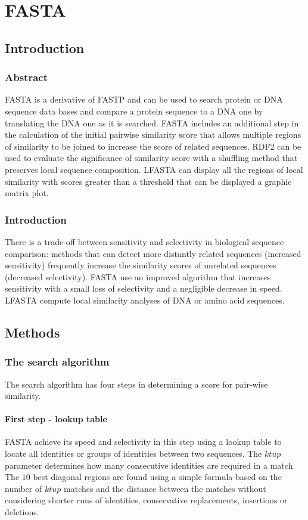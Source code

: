 \chapter{FASTA}

\section{Introduction}

	\subsection{Abstract}
	FASTA is a derivative of FASTP and can be used to search protein or DNA sequence data bases and compare a protein sequence to a DNA one by translating the DNA one as it is searched.
	FASTA includes an additional step in the calculation of the initial pairwise similarity score that allows multiple regions of similarity to be joined to increase the score of related sequences.
	RDF2 can be used to evaluate the significance of similarity score with a shuffling method that preserves local sequence composition.
	LFASTA can display all the regions of local similarity with scores greater than a threshold that can be displayed a graphic matrix plot.

	\subsection{Introduction}
	There is a trade-off between sensitivity and selectivity in biological sequence comparison: methods that can detect more distantly related sequences (increased sensitivity) frequently increase the similarity scores of unrelated sequences (decreased selectivity).
	FASTA use an improved algorithm that increases sensitivity with a small loss of selectivity and a negligible decrease in speed.
	LFASTA compute local similarity analyses of DNA or amino acid sequences.

\section{Methods}

	\subsection{The search algorithm}
	The search algorithm has four steps in determining a score for pair-wise similarity.

		\subsubsection{First step - lookup table}
		FASTA achieve its speed and selectivity in this step using a lookup table to locate all identities or groups of identities between two sequences.
		The $ktup$ parameter determines how many consecutive identities are required in a match.
		The $10$ best diagonal regions are found using a simple formula based on the number of $ktup$ matches and the distance between the matches without considering shorter runs of identities, conservative replacements, insertions or deletions.

